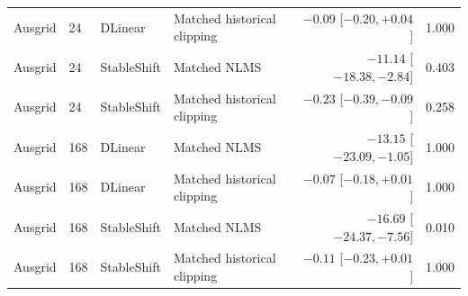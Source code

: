 \begin{longtable}{lllp{}rp{}}
Ausgrid & 24 & DLinear & Matched historical clipping & $-0.09$ [$ -0.20, +0.04 $] & 1.000\\
Ausgrid & 24 & StableShift & Matched NLMS & $-11.14$ [$ -18.38, -2.84 $] & 0.403\\
Ausgrid & 24 & StableShift & Matched historical clipping & $-0.23$ [$ -0.39, -0.09 $] & 0.258\\
Ausgrid & 168 & DLinear & Matched NLMS & $-13.15$ [$ -23.09, -1.05 $] & 1.000\\
Ausgrid & 168 & DLinear & Matched historical clipping & $-0.07$ [$ -0.18, +0.01 $] & 1.000\\
Ausgrid & 168 & StableShift & Matched NLMS & $-16.69$ [$ -24.37, -7.56 $] & 0.010\\
Ausgrid & 168 & StableShift & Matched historical clipping & $-0.11$ [$ -0.23, +0.01 $] & 1.000\\
\bottomrule
\end{longtable}
